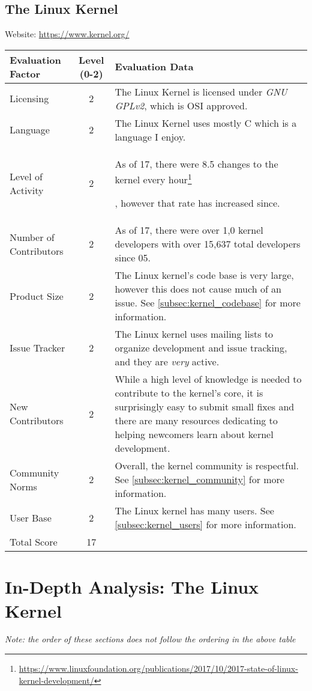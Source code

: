 \documentclass[11pt]{article}
\begin{document}
\subsection{The Linux Kernel}
\nopagebreak
Website: \url{https://www.kernel.org/}
\nopagebreak
\begin{center}
\begin{tabularx}{\textwidth}{|l|c|X|}
	\hline
	\textbf{Evaluation Factor} & \textbf{Level (0-2)} & \textbf{Evaluation Data} \\\hline
	Licensing & 2 & The Linux Kernel is licensed under \textit{GNU GPLv2}, which is OSI approved.\\\hline
	Language & 2 & The Linux Kernel uses mostly C which is a language I enjoy.\\\hline
	Level of Activity & 2 & As of 17, there were 8.5 changes to the kernel every hour\footnote{\url{https://www.linuxfoundation.org/publications/2017/10/2017-state-of-linux-kernel-development/}}\addtocounter{footnote}{-1}\addtocounter{Hfootnote}{-1}, however that rate has increased since.\\\hline
	Number of Contributors & 2 & As of 17, there were over 1,0 kernel developers with over 15,637 total developers since 05.\footnotemark\\\hline
	Product Size & 2 & The Linux kernel's code base is very large, however this does not cause much of an issue.  See \ref{subsec:kernel_codebase} for more information.\\\hline
	Issue Tracker & 2 & The Linux kernel uses mailing lists to organize development and issue tracking, and they are \textit{very} active.\\\hline
	New Contributors & 2 & While a high level of knowledge is needed to contribute to the kernel's core, it is surprisingly easy to submit small fixes and there are many resources dedicating to helping newcomers learn about kernel development.\\\hline
	Community Norms & 2 & Overall, the kernel community is respectful.  See \ref{subsec:kernel_community} for more information.\\\hline
	User Base & 2 & The Linux kernel has many users.  See \ref{subsec:kernel_users} for more information.\\\hline
	Total Score & 17 & \\\hline
\end{tabularx}
\end{center}

\newpage
\section{In-Depth Analysis: The Linux Kernel}
\textit{Note: the order of these sections does not follow the ordering in the above table}
\end{document}
